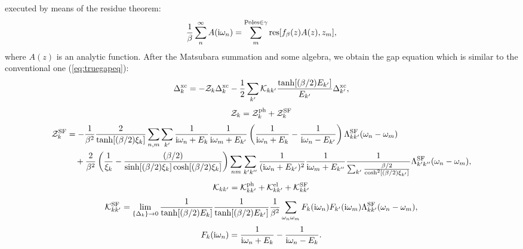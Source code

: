 executed by means of the residue theorem:
%
\begin{equation}
	\frac{1}{\beta} \sum_{n}^{\infty}A({\rm i}\omega_n) = 
	\sum_{m}^{{\rm Poles} \in \gamma} {\rm res}[f_{\beta}(z)A(z),z_{m}],
	\label{eq:residue}
\end{equation}
%
where $A(z)$ is an analytic function. After the Matsubara summation and some algebra, we obtain
the gap equation which is similar to the conventional one (\ref{eq:truegapeq}):
%
\begin{equation}
	\Delta^{\rm xc}_{k} = -{\mathcal Z}_{k}\Delta^{\rm xc}_{k} - \frac{1}{2}
	\sum_{k'} {\mathcal K}_{kk'} \frac{\tanh[(\beta/2)E_{k'}]}
	{E_{k'}} \Delta^{\rm xc}_{k'},
	\label{eq:aftergapeq}
\end{equation}
%
\begin{equation}
	\mathcal Z_{k} = \mathcal Z^{\rm ph}_{k} + \mathcal Z^{\rm SF}_{k} 
	\label{eq:Zsum}
\end{equation}
%
\begin{equation}
	\begin{split}
		\mathcal Z^{\rm SF}_{k} &= - \frac{1}{\beta^2}\frac{2}{\tanh[(\beta/2)\xi_{k}]} 
	\sum_{n,m}\sum_{k'}\frac{1}{{\rm i}\omega_n + E_k}\frac{1}{{\rm i}\omega_m + E_{k'}}
	\left(\frac{1}{{\rm i}\omega_n + E_k} - \frac{1}{ {\rm i}\omega_n - E_{k'}} \right)\Lambda^{\rm SF}_{kk'}(\omega_n - \omega_m) \\
	&\quad + \frac{2}{\beta^2}\left(\frac{1}{\xi_k} - \frac{(\beta/2)}{\sinh[(\beta/2)\xi_k]\cosh[(\beta/2)\xi_k]} \right)
	\sum_{nm}\sum_{k'k''} \frac{1}{({\rm i}\omega_n + E_{k'})^2} \frac{1}{ {\rm i}\omega_m + E_{k''}}
	\frac{1}{\sum_{k'}\frac{\beta/2}{\cosh^2\left[(\beta/2)\xi_{k'}\right]}} \Lambda^{\rm SF}_{k'k''}(\omega_n - \omega_m),
	\label{eq:ZSFdef}
\end{split}
\end{equation}
%
\begin{equation}
	\mathcal K_{kk'} = \mathcal K^{\rm ph}_{kk'} + \mathcal K^{\rm el}_{kk'} + \mathcal K^{\rm SF}_{kk'}
	\label{eq:Ksum}
\end{equation}
%
\begin{equation}
	{\mathcal K}^{\rm SF}_{kk'} = 
	\lim_{\{\Delta_{k}\} \to 0}
	\frac{1}{\tanh[(\beta/2)E_{k}]}\frac{1}{\tanh[(\beta/2)E_{k'}]}
	\frac{1}{\beta^2}
	\sum_{\omega_n\omega_m}
	F_{k}({\rm i}\omega_n)F_{k'}({\rm i}\omega_m)
	\Lambda^{\rm SF}_{kk'}(\omega_n - \omega_m),
	\label{eq:KSFdef}
\end{equation}
%
\begin{equation}
	F_{k}({\rm i}\omega_n) = \frac{1}{ {\rm i}\omega_n + E_{k}} - 
	\frac{1}{ {\rm i}\omega_n - E_{k}}.
	\label{eq:Fkdef}
\end{equation}
